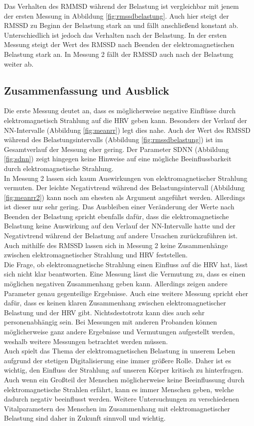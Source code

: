 Das Verhalten des RMMSD während der Belastung ist vergleichbar mit jenem der ersten Messung in Abbildung \ref{fig:rmssdbelastung}. Auch hier steigt der RMSSD zu Beginn der Belastung stark an und fällt anschließend konstant ab. Unterschiedlich ist jedoch das Verhalten nach der Belastung. In der ersten Messung steigt der Wert des RMSSD nach Beenden der elektromagnetischen Belastung stark an. In Messung 2 fällt der RMSSD auch nach der Belastung weiter ab.

\subsection{Zusammenfassung und Ausblick}
Die erste Messung deutet an, dass es möglicherweise negative Einflüsse durch elektromagnetisch Strahlung auf die HRV geben kann. Besonders der Verlauf der NN-Intervalle (Abbildung \ref{fig:meanrr}) legt dies nahe. Auch der Wert des RMSSD während des Belastungsintervalls (Abbildung \ref{fig:rmssdbelastung})  ist im Gesamtverlauf der Messung eher gering. Der Parameter SDNN (Abbildung \ref{fig:sdnn}) zeigt hingegen keine Hinweise auf eine mögliche Beeinflussbarkeit durch elektromagnetische Strahlung. \\
In Messung 2 lassen sich kaum Auswirkungen von elektromagnetischer Strahlung vermuten. Der leichte Negativtrend während des Belastungsintervall (Abbildung \ref{fig:meanrr2}) kann noch am ehesten als Argument angeführt werden. Allerdings ist dieser nur sehr gering. Das Ausbleiben einer Veränderung der Werte nach Beenden der Belastung spricht ebenfalls dafür, dass die elektromagnetische Belastung keine Auswirkung auf den Verlauf der NN-Intervalle hatte und der Negativtrend während der Belastung auf andere Ursachen zurückzuführen ist. Auch mithilfe des RMSSD lassen sich in Messung 2 keine Zusammenhänge zwischen elektromagnetischer Strahlung und HRV feststellen.\\

Die Frage, ob elektromagnetische Strahlung einen Einfluss auf die HRV hat, lässt sich nicht klar beantworten. Eine Messung lässt die Vermutung zu, dass es einen möglichen negativen Zusammenhang geben kann. Allerdings zeigen andere Parameter genau gegenteilige Ergebnisse. Auch eine weitere Messung spricht eher dafür, dass es keinen klaren Zusammenhang zwischen elektromagnetischer Belastung und der HRV gibt. Nichtsdestotrotz kann dies auch sehr personenabhängig sein. Bei Messungen mit anderen Probanden können möglicherweise ganz andere Ergebnisse und Vermutungen aufgestellt werden, weshalb weitere Messungen betrachtet werden müssen. \\
Auch spielt das Thema der elektromagnetischen Belastung in unserem Leben aufgrund der stetigen Digitalisierung eine immer größere Rolle. Daher ist es wichtig, den Einfluss der Strahlung auf unseren Körper kritisch zu hinterfragen. Auch wenn ein Großteil der Menschen möglicherweise keine Beeinflussung durch elektromagnetische Strahlen erfährt, kann es immer Menschen geben, welche dadurch negativ beeinflusst werden. Weitere Untersuchungen zu verschiedenen Vitalparametern des Menschen im Zusammenhang mit elektromagnetischer Belastung sind daher in Zukunft sinnvoll und wichtig. \\


